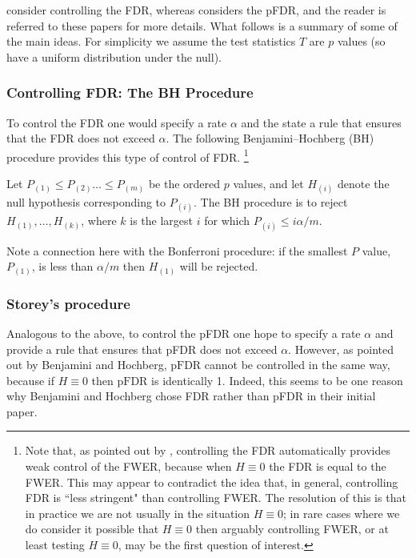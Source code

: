 \documentclass[times,11pt]{article}
\def\pFDR{\text{pFDR}}
\begin{document}
\cite{benjamini.hochberg.95} consider controlling the FDR, whereas \cite{storey.02,storey.03} considers the  pFDR, and the reader is referred to these papers for more details. What follows is a summary of some of the main ideas.  For simplicity we assume
the test statistics $T$ are $p$ values (so have a uniform distribution under the null).

\subsubsection{Controlling FDR: The BH Procedure}

To control the FDR one would specify a rate $\alpha$ and the state a rule that ensures that the FDR does not exceed $\alpha$. The following Benjamini--Hochberg (BH) procedure provides this type of control of FDR. \footnote{Note that, as pointed out by \cite{benjamini.hochberg.95}, controlling the FDR automatically provides weak control of the FWER, because when $H \equiv 0$ the FDR is equal to the FWER. This may appear to contradict the idea that, in general, controlling FDR is ``less stringent" than controlling FWER. The resolution of this is that in practice we are not usually in the situation $H \equiv 0$; in rare cases where we do consider it possible that $H \equiv 0$ then arguably controlling FWER, or at least testing $H \equiv 0$, may be the first question of interest.}

Let $P_{(1)} \leq P_{(2)} \dots \leq P_{(m)}$ be the ordered $p$ values, and let $H_{(i)}$ denote the null hypothesis corresponding to $P_{(i)}$.  
The BH procedure is to reject $H_{(1)},\dots,H_{(k)}$, where $k$ is the largest $i$ for which $P_{(i)} \leq i\alpha/m$.

Note a connection here with the Bonferroni procedure: if the smallest $P$ value, $P_{(1)}$,
is less than $\alpha/m$ then $H_{(1)}$ will be rejected. 





\subsubsection{Storey's procedure}

Analogous to the above, to control the pFDR one hope to specify a rate $\alpha$ and provide a rule that ensures that pFDR does not exceed $\alpha$. However, as pointed out by Benjamini and Hochberg, $\pFDR$ cannot be controlled in the same way, because if $H \equiv 0$ then $\pFDR$ is identically 1. Indeed, this seems to be one reason why Benjamini and Hochberg chose FDR rather than pFDR in their initial paper.
\end{document}
